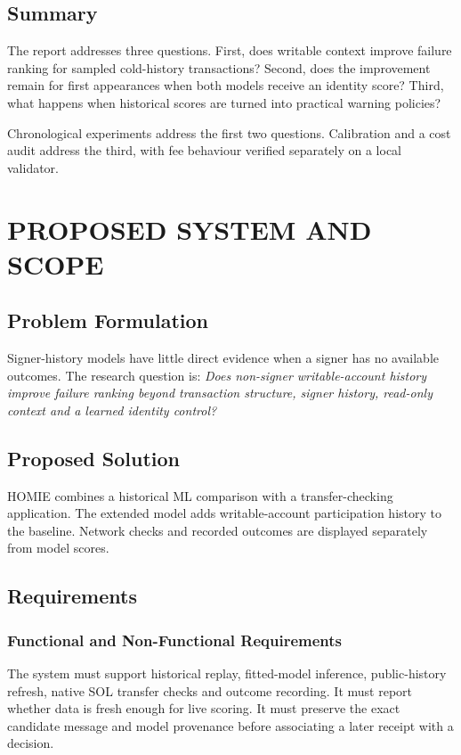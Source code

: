 \documentclass[12pt,a4paper,oneside]{report}
\begin{document}
\section{Summary}
The report addresses three questions. First, does writable context improve failure ranking for sampled cold-history transactions? Second, does the improvement remain for first appearances when both models receive an identity score? Third, what happens when historical scores are turned into practical warning policies?

Chronological experiments address the first two questions. Calibration and a cost audit address the third, with fee behaviour verified separately on a local validator.

\chapter{PROPOSED SYSTEM AND SCOPE}
\section{Problem Formulation}
Signer-history models have little direct evidence when a signer has no available outcomes. The research question is: \emph{Does non-signer writable-account history improve failure ranking beyond transaction structure, signer history, read-only context and a learned identity control?}

\section{Proposed Solution}
HOMIE combines a historical ML comparison with a transfer-checking application. The extended model adds writable-account participation history to the baseline. Network checks and recorded outcomes are displayed separately from model scores.

\section{Requirements}
\subsection{Functional and Non-Functional Requirements}
The system must support historical replay, fitted-model inference, public-history refresh, native SOL transfer checks and outcome recording. It must report whether data is fresh enough for live scoring. It must preserve the exact candidate message and model provenance before associating a later receipt with a decision.
\end{document}
